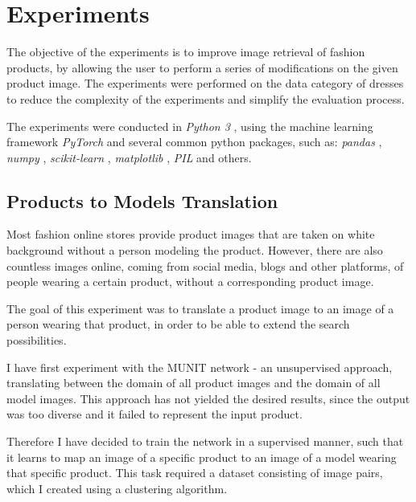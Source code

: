 \documentclass[12pt]{report}
\begin{document}
\pagebreak
\chapter{Experiments}
The objective of the experiments is to improve image retrieval of fashion products, by allowing the user to perform a series of modifications on the given product image. The experiments were performed on the data category of dresses to reduce the complexity of the experiments and simplify the evaluation process.

The experiments were conducted in \textit{Python 3} \cite{noauthor_welcome_nodate}, using the machine learning framework \textit{PyTorch} \cite{noauthor_pytorch_nodate} and several common python packages, such as: \textit{pandas} \cite{noauthor_python_nodate}, \textit{numpy} \cite{noauthor_numpy_nodate}, \textit{scikit-learn} \cite{noauthor_scikit-learn_nodate}, \textit{matplotlib} \cite{noauthor_matplotlib_nodate}, \textit{PIL} \cite{noauthor_pillow_nodate} and others. 



\pagebreak
\section{Products to Models Translation}
Most fashion online stores provide product images that are taken on white background without a person modeling the product. However, there are also countless images online, coming from social media, blogs and other platforms, of people wearing a certain product, without a corresponding product image. 

The goal of this experiment was to translate a product image to an image of a person wearing that product, in order to be able to extend the search possibilities.

I have first experiment with the MUNIT network - an unsupervised approach, translating between the domain of all product images and the domain of all model images. This approach has not yielded the desired results, since the output was too diverse and it failed to represent the input product.

Therefore I have decided to train the network in a supervised manner, such that it learns to map an image of a specific product to an image of a model wearing that specific product. This task required a dataset consisting of image pairs, which I created using a clustering algorithm.
\end{document}
